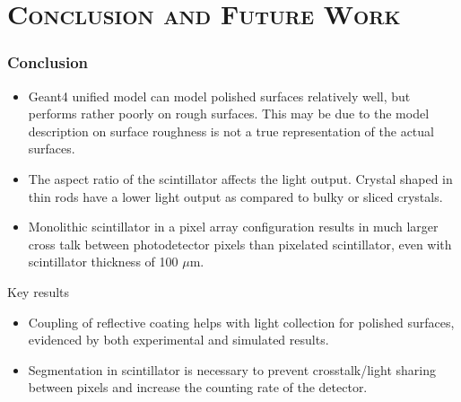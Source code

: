 \documentclass[xcolor=x11names, compress, handout]{beamer}
\renewcommand{\(}{\begin{columns}}
\renewcommand{\)}{\end{columns}}
\newcommand{\<}[1]{\begin{column}{#1}}
\renewcommand{\>}{\end{column}}
\begin{document}
\section{\scshape Conclusion and Future Work}
\begin{frame}
\frametitle{Conclusion}
\scriptsize
\begin{itemize}
\item Geant4 unified model can model polished surfaces relatively well, but performs rather poorly on rough surfaces. This may be due to the model description on surface roughness is not a true representation of the actual surfaces. 
\item The aspect ratio of the scintillator affects the light output. Crystal shaped in thin rods have a  lower light output as compared to bulky or sliced crystals. 
\item Monolithic scintillator in a pixel array configuration results in much larger cross talk between photodetector pixels than pixelated scintillator, even with scintillator thickness of 100 $\mu$m.
\end{itemize}

\begin{block}{Key results}
\begin{itemize}
  \item Coupling of reflective coating helps with light collection for polished surfaces, evidenced by both experimental and simulated results.
  \item Segmentation in scintillator is necessary to prevent crosstalk/light sharing between pixels and increase the counting rate of the detector. 
\end{itemize}
\end{block}
\vfill
\end{frame}
\end{document}
